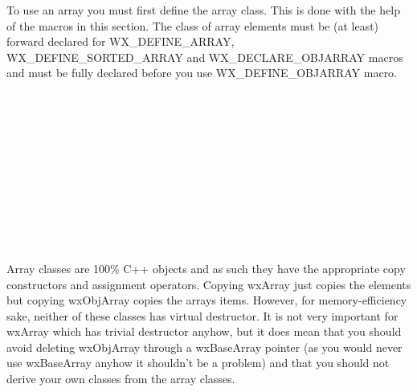 
To use an array you must first define the array class. This is done with the
help of the macros in this section. The class of array elements must be (at
least) forward declared for WX\_DEFINE\_ARRAY, WX\_DEFINE\_SORTED\_ARRAY and
WX\_DECLARE\_OBJARRAY macros and must be fully declared before you use
WX\_DEFINE\_OBJARRAY macro.

\\
\\
\\
\\
\\
\\
\\
\\
\\
\\


Array classes are 100\% C++ objects and as such they have the appropriate copy
constructors and assignment operators. Copying wxArray just copies the elements
but copying wxObjArray copies the arrays items. However, for memory-efficiency
sake, neither of these classes has virtual destructor. It is not very important
for wxArray which has trivial destructor anyhow, but it does mean that you
should avoid deleting wxObjArray through a wxBaseArray pointer (as you would
never use wxBaseArray anyhow it shouldn't be a problem) and that you should not
derive your own classes from the array classes.

\\
\\

